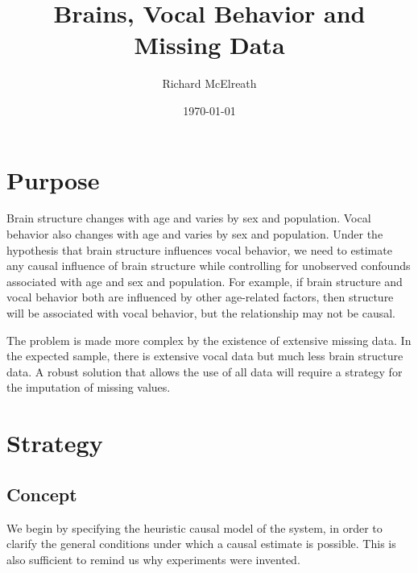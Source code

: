 \documentclass[reqno ,11pt]{amsart}
\begin{document}
\title[Brains, Vocal Behavior and Missing Data]{\large Brains, Vocal Behavior and Missing Data}
\author{Richard McElreath}
\address{Department of Human Behavior, Ecology and Culture, Max Planck Institute for Evolutionary Anthropology, Deutscher Platz 6, 04103 Leipzig, Germany}
\date{\today}


\maketitle


\linenumbers
\modulolinenumbers[5]

\section{Purpose}

Brain structure changes with age and varies by sex and population. Vocal behavior also changes with age and varies by sex and population. Under the hypothesis that brain structure influences vocal behavior, we need to estimate any causal influence of brain structure while controlling for unobserved confounds associated with age and sex and population. For example, if brain structure and vocal behavior both are influenced by other age-related factors, then structure will be associated with vocal behavior, but the relationship may not be causal. 

The problem is made more complex by the existence of extensive missing data. In the expected sample, there is extensive vocal data but much less brain structure data. A robust solution that allows the use of all data will require a strategy for the imputation of missing values.

\section{Strategy}

\subsection{Concept}

We begin by specifying the heuristic causal model of the system, in order to clarify the general conditions under which a causal estimate is possible. This is also sufficient to remind us why experiments were invented.
\end{document}
